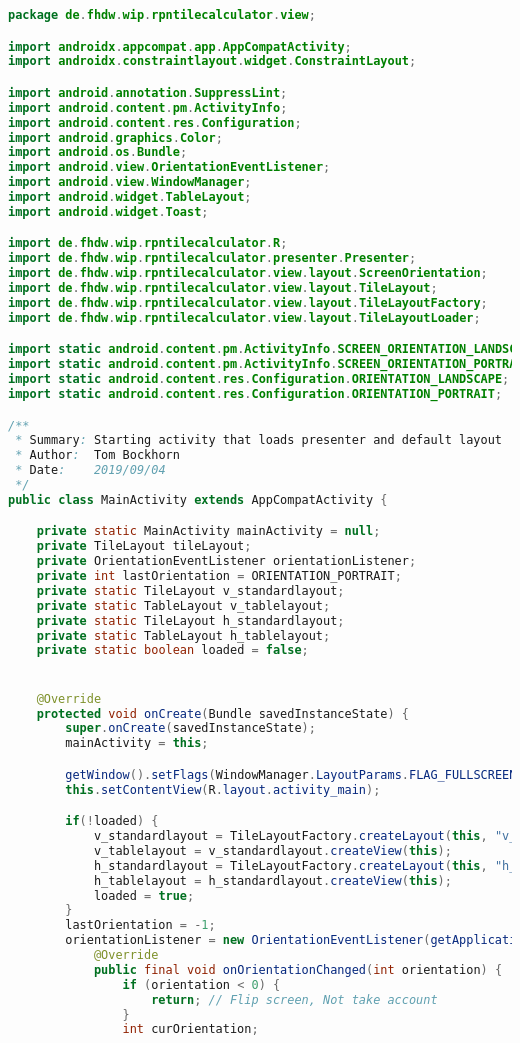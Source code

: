 \begin{lstlisting}[caption=MainActivity,label=list:MainActivity,language=Java]
package de.fhdw.wip.rpntilecalculator.view;

import androidx.appcompat.app.AppCompatActivity;
import androidx.constraintlayout.widget.ConstraintLayout;

import android.annotation.SuppressLint;
import android.content.pm.ActivityInfo;
import android.content.res.Configuration;
import android.graphics.Color;
import android.os.Bundle;
import android.view.OrientationEventListener;
import android.view.WindowManager;
import android.widget.TableLayout;
import android.widget.Toast;

import de.fhdw.wip.rpntilecalculator.R;
import de.fhdw.wip.rpntilecalculator.presenter.Presenter;
import de.fhdw.wip.rpntilecalculator.view.layout.ScreenOrientation;
import de.fhdw.wip.rpntilecalculator.view.layout.TileLayout;
import de.fhdw.wip.rpntilecalculator.view.layout.TileLayoutFactory;
import de.fhdw.wip.rpntilecalculator.view.layout.TileLayoutLoader;

import static android.content.pm.ActivityInfo.SCREEN_ORIENTATION_LANDSCAPE;
import static android.content.pm.ActivityInfo.SCREEN_ORIENTATION_PORTRAIT;
import static android.content.res.Configuration.ORIENTATION_LANDSCAPE;
import static android.content.res.Configuration.ORIENTATION_PORTRAIT;

/**
 * Summary: Starting activity that loads presenter and default layout
 * Author:  Tom Bockhorn
 * Date:    2019/09/04
 */
public class MainActivity extends AppCompatActivity {

    private static MainActivity mainActivity = null;
    private TileLayout tileLayout;
    private OrientationEventListener orientationListener;
    private int lastOrientation = ORIENTATION_PORTRAIT;
    private static TileLayout v_standardlayout;
    private static TableLayout v_tablelayout;
    private static TileLayout h_standardlayout;
    private static TableLayout h_tablelayout;
    private static boolean loaded = false;


    @Override
    protected void onCreate(Bundle savedInstanceState) {
        super.onCreate(savedInstanceState);
        mainActivity = this;

        getWindow().setFlags(WindowManager.LayoutParams.FLAG_FULLSCREEN,WindowManager.LayoutParams.FLAG_FULLSCREEN);
        this.setContentView(R.layout.activity_main);

        if(!loaded) {
            v_standardlayout = TileLayoutFactory.createLayout(this, "v_Standardlayout");
            v_tablelayout = v_standardlayout.createView(this);
            h_standardlayout = TileLayoutFactory.createLayout(this, "h_Standardlayout");
            h_tablelayout = h_standardlayout.createView(this);
            loaded = true;
        }
        lastOrientation = -1;
        orientationListener = new OrientationEventListener(getApplicationContext()) {
            @Override
            public final void onOrientationChanged(int orientation) {
                if (orientation < 0) {
                    return; // Flip screen, Not take account
                }
                int curOrientation;


\end{lstlisting}
